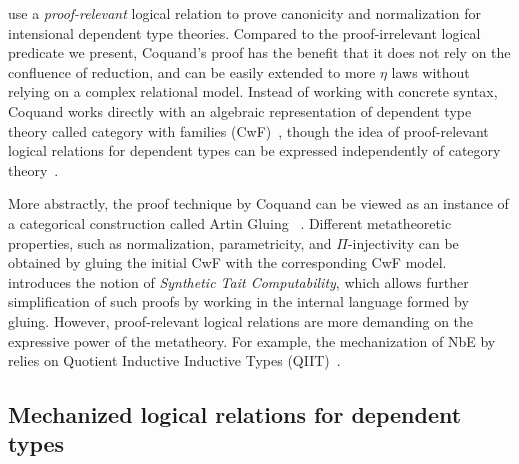 \documentclass[\ifpublic nolinenum\else\fi,online,OA]{jfp}
\theoremstyle{definition}
\begin{document}
\citet{coquand:canonicity,coquand:prop} use a \emph{proof-relevant} logical
relation to prove canonicity and normalization for intensional
dependent type theories. %
Compared
to the proof-irrelevant logical predicate we present, Coquand's proof
has the benefit that it does not rely on the confluence of reduction,
and can be easily extended to more $\eta$ laws without relying on a
complex relational model. Instead of working with concrete syntax,
Coquand works directly with an algebraic representation of dependent
type theory called category with families (CwF)~\citep{hofmann:cwf},
though the idea of proof-relevant logical relations for dependent
types can be expressed independently of category
theory~\citep{barras2012semantical}.

More abstractly, the proof technique by Coquand can be viewed as an
instance of a categorical construction called Artin Gluing
~\citep{kaposi:gluing}. Different metatheoretic
properties, such as normalization, parametricity, and
$\Pi$-injectivity can be obtained by gluing the initial CwF with the
corresponding CwF model. \citet{sterling:tait} introduces the notion of
\emph{Synthetic Tait Computability}, which allows further
simplification of such proofs by working in the internal language
formed by gluing.
However, proof-relevant logical relations are more demanding on the
expressive power of the metatheory. For example, the mechanization of
NbE by \citet{altenkirch:normalisation} relies on Quotient Inductive
Inductive Types (QIIT)~\citep{kaposi:qiit}.


\subsection{Mechanized logical relations for dependent types}
\end{document}
